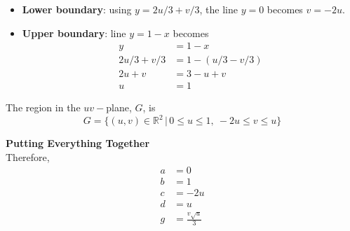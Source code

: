{\begin{itemize}
        \item \textbf{Lower boundary}: using $y = 2u/3+v/3$, the line $y=0$ becomes $v=-2u$. 
        \item \textbf{Upper boundary}: line $y=1-x$ becomes 
        \begin{align}
            y&= 1- x \\
            2u/3+v/3 &= 1 - (u/3 - v/3) \\
            2u+v &= 3- u +v \\
            u &= 1
        \end{align}
    \end{itemize}
    The region in the $uv-$plane, $G$, is 
    $$G = \{(u,v) \in \mathbb R^2 \, | \, 0 \le u \le 1, \ -2u \le v \le u \}$$

    \textbf{Putting Everything Together}\\
    Therefore, 
    \begin{align}
        a & = 0 \\
        b &= 1 \\
        c &= -2u \\
        d &= u \\
        g &= \frac{v\sqrt u}{3}
    \end{align}
    
}
